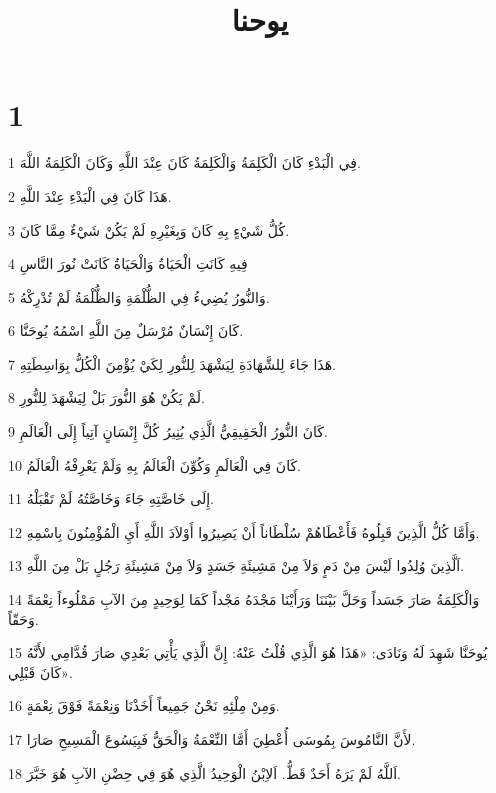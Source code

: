 

\title{يوحنا}


\chapter{1}

\par 1 فِي الْبَدْءِ كَانَ الْكَلِمَةُ وَالْكَلِمَةُ كَانَ عِنْدَ اللَّهِ وَكَانَ الْكَلِمَةُ اللَّهَ.
\par 2 هَذَا كَانَ فِي الْبَدْءِ عِنْدَ اللَّهِ.
\par 3 كُلُّ شَيْءٍ بِهِ كَانَ وَبِغَيْرِهِ لَمْ يَكُنْ شَيْءٌ مِمَّا كَانَ.
\par 4 فِيهِ كَانَتِ الْحَيَاةُ وَالْحَيَاةُ كَانَتْ نُورَ النَّاسِ
\par 5 وَالنُّورُ يُضِيءُ فِي الظُّلْمَةِ وَالظُّلْمَةُ لَمْ تُدْرِكْهُ.
\par 6 كَانَ إِنْسَانٌ مُرْسَلٌ مِنَ اللَّهِ اسْمُهُ يُوحَنَّا.
\par 7 هَذَا جَاءَ لِلشَّهَادَةِ لِيَشْهَدَ لِلنُّورِ لِكَيْ يُؤْمِنَ الْكُلُّ بِوَاسِطَتِهِ.
\par 8 لَمْ يَكُنْ هُوَ النُّورَ بَلْ لِيَشْهَدَ لِلنُّورِ.
\par 9 كَانَ النُّورُ الْحَقِيقِيُّ الَّذِي يُنِيرُ كُلَّ إِنْسَانٍ آتِياً إِلَى الْعَالَمِ.
\par 10 كَانَ فِي الْعَالَمِ وَكُوِّنَ الْعَالَمُ بِهِ وَلَمْ يَعْرِفْهُ الْعَالَمُ.
\par 11 إِلَى خَاصَّتِهِ جَاءَ وَخَاصَّتُهُ لَمْ تَقْبَلْهُ.
\par 12 وَأَمَّا كُلُّ الَّذِينَ قَبِلُوهُ فَأَعْطَاهُمْ سُلْطَاناً أَنْ يَصِيرُوا أَوْلاَدَ اللَّهِ أَيِ الْمُؤْمِنُونَ بِاسْمِهِ.
\par 13 اَلَّذِينَ وُلِدُوا لَيْسَ مِنْ دَمٍ وَلاَ مِنْ مَشِيئَةِ جَسَدٍ وَلاَ مِنْ مَشِيئَةِ رَجُلٍ بَلْ مِنَ اللَّهِ.
\par 14 وَالْكَلِمَةُ صَارَ جَسَداً وَحَلَّ بَيْنَنَا وَرَأَيْنَا مَجْدَهُ مَجْداً كَمَا لِوَحِيدٍ مِنَ الآبِ مَمْلُوءاً نِعْمَةً وَحَقّاً.
\par 15 يُوحَنَّا شَهِدَ لَهُ وَنَادَى: «هَذَا هُوَ الَّذِي قُلْتُ عَنْهُ: إِنَّ الَّذِي يَأْتِي بَعْدِي صَارَ قُدَّامِي لأَنَّهُ كَانَ قَبْلِي».
\par 16 وَمِنْ مِلْئِهِ نَحْنُ جَمِيعاً أَخَذْنَا وَنِعْمَةً فَوْقَ نِعْمَةٍ.
\par 17 لأَنَّ النَّامُوسَ بِمُوسَى أُعْطِيَ أَمَّا النِّعْمَةُ وَالْحَقُّ فَبِيَسُوعَ الْمَسِيحِ صَارَا.
\par 18 اَللَّهُ لَمْ يَرَهُ أَحَدٌ قَطُّ. اَلاِبْنُ الْوَحِيدُ الَّذِي هُوَ فِي حِضْنِ الآبِ هُوَ خَبَّرَ.
